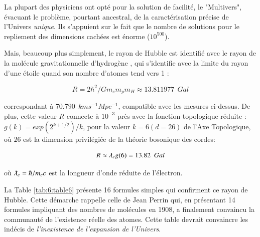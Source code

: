 \documentclass[a4paper,9pt]{article}
\begin{document}
La plupart des physiciens ont opté pour la solution de facilité, le "Multivers", évacuant le problème, pourtant ancestral, de la caractérisation précise de l'Univers \textit{unique}. Ils s'appuient sur le fait que le nombre de solutions pour le repliement des dimensions cachées est énorme ($10^{500}$). 

Mais, beaucoup plus simplement, le rayon de Hubble est identifié avec le rayon de la molécule gravitationnelle d'hydrogène  \cite{Sanchez2}, qui s'identifie avec
 la limite du rayon d'une étoile quand son nombre d'atomes tend vers 1 \cite{Davies1}:

\begin{equation}
R =  2 \hbar^2/Gm_e m_p m_H \approx 13.811977~~Gal
 \end{equation}


correspondant à $70.790 ~~ km s^{-1} Mpc^{-1}$, compatible avec les mesures ci-dessus. De plus, cette valeur $R$ connecte à $10^{-3}$ près avec la fonction topologique réduite : $g(k) = exp(2^{k+1/2})/k$, pour la valeur $k = 6 (d = 26)$ de l'Axe Topologique, où $26$ est la dimension privilégiée de la théorie bosonique des cordes: 

\begin{equation}
R \approx \lambdabar_e g(6) = 13.82~~Gal
 \end{equation}

où $\lambdabar_e = \hbar/m_ec$ est la longueur d'onde réduite de l'électron. 

La Table \ref{tab:6:table6} présente 16 formules simples qui confirment ce rayon de Hubble. Cette démarche rappelle celle de Jean Perrin qui, en présentant 14 formules impliquant des nombres de molécules en 1908, a finalement convaincu la communauté de l'existence réelle des atomes. Cette table devrait convaincre les indécis de \textit{l'inexistence de l'expansion de l'Univers}.
 
\end{document}
